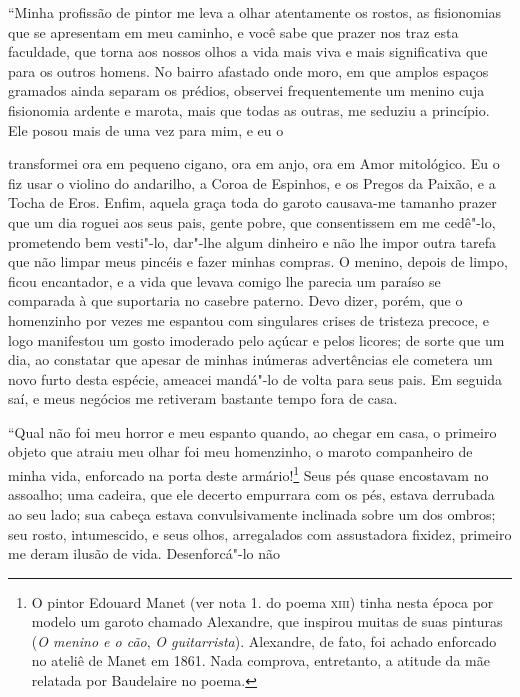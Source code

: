 “Minha profissão de pintor me leva a olhar atentamente os
rostos, as fisionomias que se apresentam em meu caminho, e você sabe que
prazer nos traz esta faculdade, que torna aos nossos olhos a vida mais
viva e mais significativa que para os outros homens. No bairro afastado
onde moro, em que amplos espaços gramados ainda separam os prédios,
observei frequentemente um menino cuja fisionomia ardente e marota,
mais que todas as outras, me seduziu a princípio. Ele posou mais de
uma vez para mim, e eu o \linebreak

\quebra

\noindent{}transformei ora em pequeno cigano, ora em
anjo, ora em Amor mitológico. Eu o fiz usar o violino do andarilho, a
Coroa de Espinhos, e os Pregos da Paixão, e a Tocha de Eros. Enfim,
aquela graça toda do garoto causava-me tamanho prazer que 
um dia roguei aos seus pais, gente pobre, que consentissem em me cedê"-lo,
prometendo bem vesti"-lo, dar"-lhe algum dinheiro e não lhe impor 
outra tarefa que não limpar meus pincéis e fazer minhas compras. O
menino, depois de limpo, ficou encantador, e a vida que levava
comigo lhe parecia um paraíso se comparada à que suportaria no casebre
paterno. Devo dizer, porém, que o homenzinho por vezes me espantou com
singulares crises de tristeza precoce, e logo manifestou um gosto
imoderado pelo açúcar e pelos licores; de sorte que um dia, ao constatar que apesar de minhas inúmeras advertências ele cometera
um novo furto desta espécie, ameacei mandá"-lo de volta para seus pais.
Em seguida saí, e meus negócios me retiveram bastante tempo fora de
casa.

“Qual não foi meu horror e meu espanto quando, ao chegar em
casa, o primeiro objeto que atraiu meu olhar foi meu homenzinho, o
maroto companheiro de minha vida, enforcado na porta deste
armário!\protect\footnote{  O pintor Edouard Manet (ver nota 1. do poema 
\textsc{xiii}) tinha nesta época
por modelo um garoto chamado Alexandre, que inspirou muitas de suas
pinturas (\textit{O menino e o cão}, \textit{O guitarrista}). Alexandre, de fato,
foi achado enforcado no ateliê de Manet em 1861. Nada comprova,
entretanto, a atitude da mãe relatada por Baudelaire no poema.} 
Seus pés quase encostavam no assoalho; uma
cadeira, que ele decerto empurrara com os pés, estava derrubada ao
seu lado; sua cabeça estava convulsivamente inclinada sobre um dos 
ombros; seu rosto, intumescido, e seus olhos, arregalados com 
assustadora fixidez, primeiro me deram ilusão de vida.
Desenforcá"-lo não


